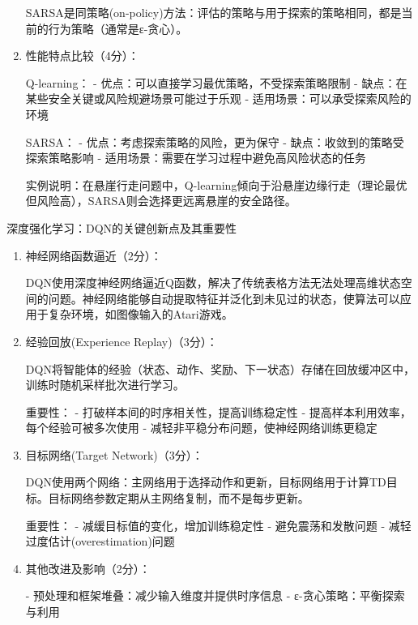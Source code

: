 \documentclass[zihao=5,answers]{BHCexam}
\begin{document}
\begin{questions}
\begin{solution}
\begin{enumerate}
    SARSA是同策略(on-policy)方法：评估的策略与用于探索的策略相同，都是当前的行为策略（通常是ε-贪心）。
    
    \item 性能特点比较（4分）：
    
    Q-learning：
    - 优点：可以直接学习最优策略，不受探索策略限制
    - 缺点：在某些安全关键或风险规避场景可能过于乐观
    - 适用场景：可以承受探索风险的环境
    
    SARSA：
    - 优点：考虑探索策略的风险，更为保守
    - 缺点：收敛到的策略受探索策略影响
    - 适用场景：需要在学习过程中避免高风险状态的任务
    
    实例说明：在悬崖行走问题中，Q-learning倾向于沿悬崖边缘行走（理论最优但风险高），SARSA则会选择更远离悬崖的安全路径。
\end{enumerate}
\end{solution}

\question[10] 深度强化学习：DQN的关键创新点及其重要性
\begin{solution}
\begin{enumerate}
    \item 神经网络函数逼近（2分）：
    
    DQN使用深度神经网络逼近Q函数，解决了传统表格方法无法处理高维状态空间的问题。神经网络能够自动提取特征并泛化到未见过的状态，使算法可以应用于复杂环境，如图像输入的Atari游戏。
    
    \item 经验回放(Experience Replay)（3分）：
    
    DQN将智能体的经验（状态、动作、奖励、下一状态）存储在回放缓冲区中，训练时随机采样批次进行学习。
    
    重要性：
    - 打破样本间的时序相关性，提高训练稳定性
    - 提高样本利用效率，每个经验可被多次使用
    - 减轻非平稳分布问题，使神经网络训练更稳定
    
    \item 目标网络(Target Network)（3分）：
    
    DQN使用两个网络：主网络用于选择动作和更新，目标网络用于计算TD目标。目标网络参数定期从主网络复制，而不是每步更新。
    
    重要性：
    - 减缓目标值的变化，增加训练稳定性
    - 避免震荡和发散问题
    - 减轻过度估计(overestimation)问题
    
    \item 其他改进及影响（2分）：
    
    - 预处理和框架堆叠：减少输入维度并提供时序信息
    - ε-贪心策略：平衡探索与利用
    

\end{enumerate}
\end{solution}
\end{questions}
\end{document}
